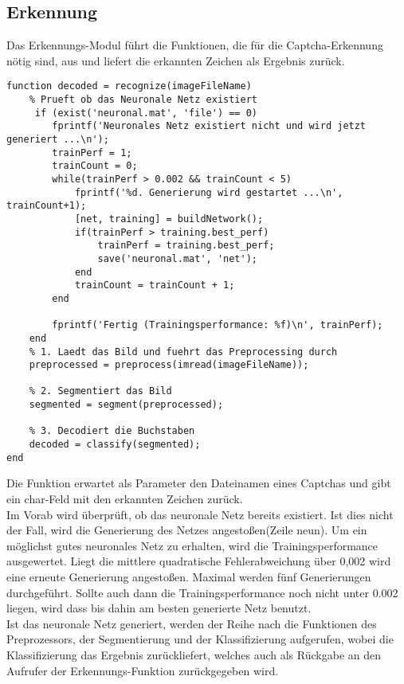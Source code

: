 \subsection{Erkennung}
Das Erkennungs-Modul führt die Funktionen, die für die Captcha-Erkennung nötig sind, aus und liefert die erkannten Zeichen als Ergebnis zurück.
\begin{lstlisting}
function decoded = recognize(imageFileName)
    % Prueft ob das Neuronale Netz existiert
     if (exist('neuronal.mat', 'file') == 0)
        fprintf('Neuronales Netz existiert nicht und wird jetzt generiert ...\n');
        trainPerf = 1;
        trainCount = 0;
        while(trainPerf > 0.002 && trainCount < 5)
            fprintf('%d. Generierung wird gestartet ...\n', trainCount+1);
            [net, training] = buildNetwork();
            if(trainPerf > training.best_perf)
                trainPerf = training.best_perf;
                save('neuronal.mat', 'net');
            end
            trainCount = trainCount + 1;
        end
    
        fprintf('Fertig (Trainingsperformance: %f)\n', trainPerf);
    end
    % 1. Laedt das Bild und fuehrt das Preprocessing durch
    preprocessed = preprocess(imread(imageFileName));
    
    % 2. Segmentiert das Bild
    segmented = segment(preprocessed);
    
    % 3. Decodiert die Buchstaben
    decoded = classify(segmented);
end
\end{lstlisting}
Die Funktion erwartet als Parameter den Dateinamen eines Captchas und gibt ein char-Feld mit den erkannten Zeichen zurück.\\
Im Vorab wird überprüft, ob das neuronale Netz bereits existiert. Ist dies nicht der Fall, wird die Generierung des Netzes angestoßen(Zeile neun). Um ein möglichst gutes neuronales Netz zu erhalten, wird die Trainingsperformance ausgewertet. Liegt die mittlere quadratische Fehlerabweichung über 0,002 wird eine erneute Generierung angestoßen. Maximal werden fünf Generierungen durchgeführt. Sollte auch dann die Trainingsperformance noch nicht unter 0.002 liegen, wird dass bis dahin am besten generierte Netz benutzt.\\
Ist das neuronale Netz generiert, werden der Reihe nach die Funktionen des Preprozessors, der Segmentierung und der Klassifizierung aufgerufen, wobei die Klassifizierung das Ergebnis zurückliefert, welches auch als Rückgabe an den Aufrufer der Erkennungs-Funktion zurückgegeben wird.
\newpage
